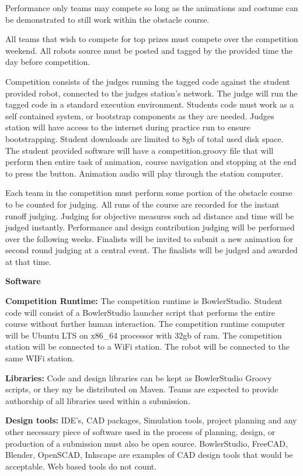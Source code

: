 \documentclass{article}
\begin{document}
Performance only teams may compete so long as the animations and costume can be demonstrated to still work within the obstacle course. 

All teams that wish to compete for top prizes must compete over the competition weekend. All robots source must be posted and tagged by the provided time the day before competition. 

Competition consists of the judges running the tagged code against the student provided robot, connected to the judges station's network. The judge will run the tagged code in a standard execution environment. Students code must work as a self contained system, or bootstrap components as they are needed. Judges station will have access to the internet during practice run to ensure bootstrapping. Student downloads are limited to 8gb of total used disk space. The student provided software will have a competition.groovy file that will perform then entire task of animation, course navigation and stopping at the end to press the button. Animation audio will play through the station computer. 

Each team in the competition must perform some portion of the obstacle course to be counted for judging. All runs of the course are recorded for the instant runoff judging. Judging for objective measures such ad distance and time will be judged instantly. Performance and design contribution judging will be performed over the following weeks. Finalists will be invited to submit a new animation for second round judging at a central event. The finalists will be judged and awarded at that time. 


 \pagebreak

{\huge \textbf{Software}}

\textbf{Competition Runtime:} The competition runtime is BowlerStudio. Student code will consist of a BowlerStudio launcher script that performs the entire course without further human interaction. The competition runtime computer will be Ubuntu LTS on x86\_64 processor with 32gb of ram. The competition station will be connected to a WiFi station. The robot will be connected to the same WIFi station.  

\textbf{Libraries:} Code and design libraries can be kept as BowlerStudio Groovy scripts, or they my be distributed on Maven. Teams are expected to provide authorship of all libraries used within a submission. 

\textbf{Design tools:} IDE's, CAD packages, Simulation tools, project planning and any other necessary piece of software used in the process of planning, design, or production of a submission must also be open source. BowlerStudio, FreeCAD, Blender, OpenSCAD, Inkscape are examples of CAD design tools that would be acceptable. Web based tools do not count.  


\vspace{1cm}
 
 
\end{document}
